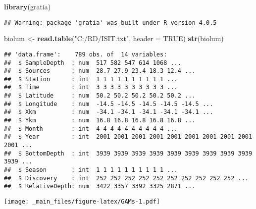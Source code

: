 \documentclass[
]{book}
\newenvironment{Shaded}{\begin{snugshade}}{\end{snugshade}}
\newcommand{\DataTypeTok}[1]{\textcolor[rgb]{0.13,0.29,0.53}{#1}}
\newcommand{\KeywordTok}[1]{\textcolor[rgb]{0.13,0.29,0.53}{\textbf{#1}}}
\newcommand{\NormalTok}[1]{#1}
\newcommand{\OperatorTok}[1]{\textcolor[rgb]{0.81,0.36,0.00}{\textbf{#1}}}
\newcommand{\OtherTok}[1]{\textcolor[rgb]{0.56,0.35,0.01}{#1}}
\newcommand{\StringTok}[1]{\textcolor[rgb]{0.31,0.60,0.02}{#1}}
\begin{document}
\begin{Shaded}
\begin{Highlighting}[]
\KeywordTok{library}\NormalTok{(gratia)}
\end{Highlighting}
\end{Shaded}

\begin{verbatim}
## Warning: package 'gratia' was built under R version 4.0.5
\end{verbatim}

\begin{Shaded}
\begin{Highlighting}[]
\NormalTok{biolum <-}\StringTok{ }\KeywordTok{read.table}\NormalTok{(}\StringTok{"C:/RD/ISIT.txt"}\NormalTok{, }\DataTypeTok{header =} \OtherTok{TRUE}\NormalTok{)}
\KeywordTok{str}\NormalTok{(biolum)}
\end{Highlighting}
\end{Shaded}

\begin{verbatim}
## 'data.frame':    789 obs. of  14 variables:
##  $ SampleDepth  : num  517 582 547 614 1068 ...
##  $ Sources      : num  28.7 27.9 23.4 18.3 12.4 ...
##  $ Station      : int  1 1 1 1 1 1 1 1 1 1 ...
##  $ Time         : int  3 3 3 3 3 3 3 3 3 3 ...
##  $ Latitude     : num  50.2 50.2 50.2 50.2 50.2 ...
##  $ Longitude    : num  -14.5 -14.5 -14.5 -14.5 -14.5 ...
##  $ Xkm          : num  -34.1 -34.1 -34.1 -34.1 -34.1 ...
##  $ Ykm          : num  16.8 16.8 16.8 16.8 16.8 ...
##  $ Month        : int  4 4 4 4 4 4 4 4 4 4 ...
##  $ Year         : int  2001 2001 2001 2001 2001 2001 2001 2001 2001 2001 ...
##  $ BottomDepth  : int  3939 3939 3939 3939 3939 3939 3939 3939 3939 3939 ...
##  $ Season       : int  1 1 1 1 1 1 1 1 1 1 ...
##  $ Discovery    : int  252 252 252 252 252 252 252 252 252 252 ...
##  $ RelativeDepth: num  3422 3357 3392 3325 2871 ...
\end{verbatim}

\begin{Shaded}
\end{Shaded}

\texttt{[image: \_main\_files/figure-latex/GAMs-1.pdf]}
\end{document}
